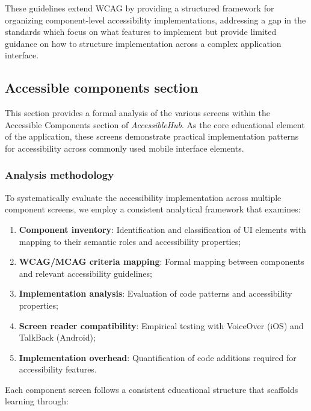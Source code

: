 These guidelines extend WCAG by providing a structured framework for organizing component-level accessibility implementations, addressing a gap in the standards which focus on what features to implement but provide limited guidance on how to structure implementation across a complex application interface.

\subsection{Accessible components section}
\label{subsec:accessible-components}

This section provides a formal analysis of the various screens within the Accessible Components section of \textit{AccessibleHub}. As the core educational element of the application, these screens demonstrate practical implementation patterns for accessibility across commonly used mobile interface elements. 

\subsubsection{Analysis methodology}
\label{subsubsec:components-methodology}

To systematically evaluate the accessibility implementation across multiple component screens, we employ a consistent analytical framework that examines:

\begin{enumerate}
    \item \textbf{Component inventory}: Identification and classification of UI elements with mapping to their semantic roles and accessibility properties;
    
    \item \textbf{WCAG/MCAG criteria mapping}: Formal mapping between components and relevant accessibility guidelines;
    
    \item \textbf{Implementation analysis}: Evaluation of code patterns and accessibility properties;
    
    \item \textbf{Screen reader compatibility}: Empirical testing with VoiceOver (iOS) and TalkBack (Android);
    
    \item \textbf{Implementation overhead}: Quantification of code additions required for accessibility features.
\end{enumerate}

Each component screen follows a consistent educational structure that scaffolds learning through:

